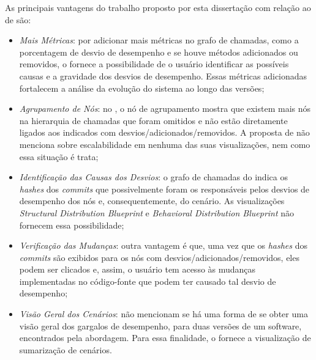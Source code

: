 As principais vantagens do trabalho proposto por esta dissertação com relação ao de \citeauthor{Bergel} são:
\begin{itemize}
   \item \textit{Mais Métricas}: por adicionar mais métricas no grafo de chamadas, como a porcentagem de desvio de desempenho e se houve métodos adicionados ou removidos, o {\textit{\toolName}} fornece a possibilidade de o usuário identificar as possíveis causas e a gravidade dos desvios de desempenho. Essas métricas adicionadas fortalecem a análise da evolução do sistema ao longo das versões;
   \item \textit{Agrupamento de Nós}: no {\textit{\toolName}}, o nó de agrupamento mostra que existem mais nós na hierarquia de chamadas que foram omitidos e não estão diretamente ligados aos indicados com desvios/adicionados/removidos. A proposta de \citeauthor{Bergel} não menciona sobre escalabilidade em nenhuma das suas visualizações, nem como essa situação é trata;
   \item \textit{Identificação das Causas dos Desvios}: o grafo de chamadas do {\textit{\toolName}} indica os \textit{hashes} dos \textit{commits} que possivelmente foram os responsáveis pelos desvios de desempenho dos nós e, consequentemente, do cenário. As visualizações \textit{Structural Distribution Blueprint} e \textit{Behavioral Distribution Blueprint} não fornecem essa possibilidade;
   \item \textit{Verificação das Mudanças}: outra vantagem é que, uma vez que os \textit{hashes} dos \textit{commits} são exibidos para os nós com desvios/adicionados/removidos, eles podem ser clicados e, assim, o usuário tem acesso às mudanças implementadas no código-fonte que podem ter causado tal desvio de desempenho;
   \item \textit{Visão Geral dos Cenários}: \citeauthor{Bergel} não mencionam se há uma forma de se obter uma visão geral dos gargalos de desempenho, para duas versões de um software, encontrados pela abordagem. Para essa finalidade, o {\textit{\toolName}} fornece a visualização de sumarização de cenários.
\end{itemize}

